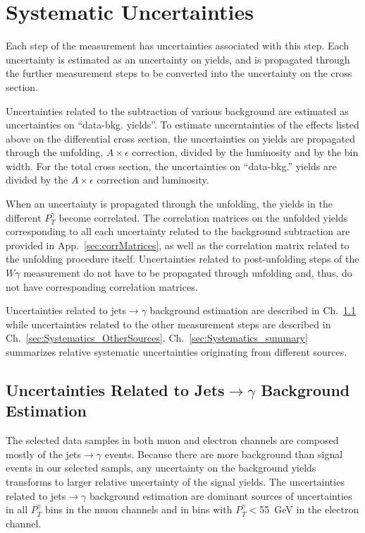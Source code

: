 \section{Systematic Uncertainties}
\label{sec:Systematics}

Each step of the measurement has uncertainties associated with this step. Each uncertainty is estimated as an uncertainty on yields, and is propagated through the further measurement steps to be converted into the uncertainty on the cross section. 

Uncertainties related to the subtraction of various background are estimated as uncertainties on ``data-bkg. yields''. To estimate uncerntainties of the effects listed above on the differential cross section, the uncertainties on yields are propagated through the unfolding, $A \times \epsilon$ correction, divided by the luminosity and by the bin width. For the total cross section, the uncertainties on ``data-bkg.'' yields are divided by the $A \times \epsilon$ correction and luminosity. 

When an uncertainty is propagated through the unfolding, the yields in the different $P_T^{\gamma}$ become correlated. The correlation matrices on the unfolded yields corresponding to all each uncertainty related to the background subtraction are provided in App.~\ref{sec:corrMatrices}, as well as the correlation matrix related to the unfolding procedure itself. Uncertainties related to post-unfolding steps of the $W\gamma$ measurement do not have to be propagated through unfolding and, thus, do not have corresponding correlation matrices. 

Uncertainties related to jets$\rightarrow\gamma$ background estimation are described in Ch.~\ref{sec:Systematics_jtog} while uncertainties related to the other measurement steps are described in Ch.~\ref{sec:Systematics_OtherSources}. Ch.~\ref{sec:Systematics_summary} summarizes relative systematic uncertainties originating from different sources.

\subsection{Uncertainties Related to Jets$\rightarrow\gamma$ Background Estimation}
\label{sec:Systematics_jtog}

The selected data samples in both muon and electron channels are composed mostly of the jets$\rightarrow\gamma$ events. Because there are more background than signal events in our selected sampls, any uncertainty on the background yields transforms to larger relative uncertainty of the signal yields. The uncertainties related to jets$\rightarrow\gamma$ background estimation are dominant sources of uncertainties in all $P_T^{\gamma}$ bins in the muon channels and in bins with $P_T^{\gamma}<$55~GeV in the electron channel.

